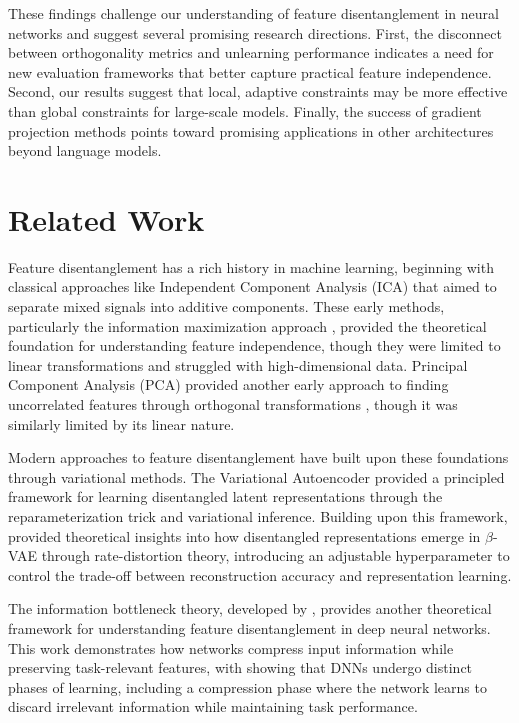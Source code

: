\documentclass{article} %
\begin{document}
These findings challenge our understanding of feature disentanglement in neural networks and suggest several promising research directions. First, the disconnect between orthogonality metrics and unlearning performance indicates a need for new evaluation frameworks that better capture practical feature independence. Second, our results suggest that local, adaptive constraints may be more effective than global constraints for large-scale models. Finally, the success of gradient projection methods points toward promising applications in other architectures beyond language models.

\section{Related Work}
\label{sec:related}

Feature disentanglement has a rich history in machine learning, beginning with classical approaches like Independent Component Analysis (ICA) that aimed to separate mixed signals into additive components. These early methods, particularly the information maximization approach \cite{Bell1995AnIA}, provided the theoretical foundation for understanding feature independence, though they were limited to linear transformations and struggled with high-dimensional data. Principal Component Analysis (PCA) provided another early approach to finding uncorrelated features through orthogonal transformations \cite{Moore1981PrincipalCA}, though it was similarly limited by its linear nature.

Modern approaches to feature disentanglement have built upon these foundations through variational methods. The Variational Autoencoder \cite{Kingma2013AutoEncodingVB} provided a principled framework for learning disentangled latent representations through the reparameterization trick and variational inference. Building upon this framework, \cite{Burgess2018UnderstandingDI} provided theoretical insights into how disentangled representations emerge in $\beta$-VAE through rate-distortion theory, introducing an adjustable hyperparameter to control the trade-off between reconstruction accuracy and representation learning.

The information bottleneck theory, developed by \cite{Tishby2015DeepLA}, provides another theoretical framework for understanding feature disentanglement in deep neural networks. This work demonstrates how networks compress input information while preserving task-relevant features, with \cite{Shwartz-Ziv2017OpeningTB} showing that DNNs undergo distinct phases of learning, including a compression phase where the network learns to discard irrelevant information while maintaining task performance.
\end{document}
